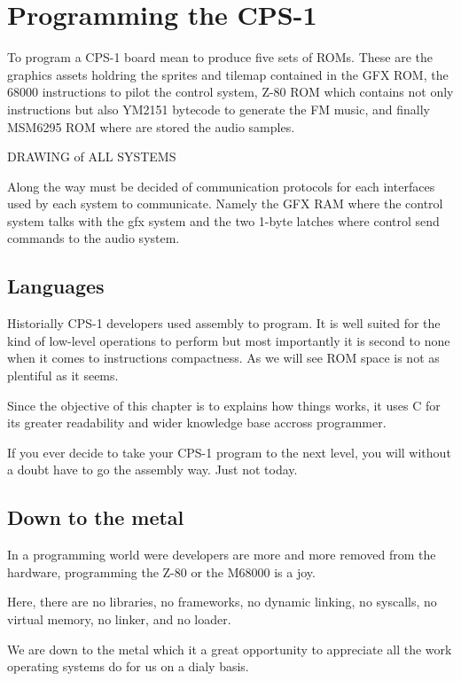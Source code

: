 \chapter{Programming the CPS-1}

To program a CPS-1 board mean to produce five sets of ROMs. These are the graphics assets holdring the sprites and tilemap contained in the GFX ROM, the 68000 instructions to pilot the control system, Z-80 ROM which contains not only instructions but also YM2151 bytecode to generate the FM music, and finally MSM6295 ROM where are stored the audio samples.

\vfill
DRAWING of ALL SYSTEMS

Along the way must be decided of communication protocols for each interfaces used by each system to communicate. Namely the GFX RAM where the control system talks with the gfx system and the two 1-byte latches where control send commands to the audio system.

\pagebreak

\section{Languages}
Historially CPS-1 developers used assembly to program. It is well suited for the kind of low-level operations to perform but most importantly it is second to none when it comes to instructions compactness. As we will see ROM space is not as plentiful as it seems.

Since the objective of this chapter is to explains how things works, it uses C for its greater readability and wider knowledge base accross programmer.

If you ever decide to take your CPS-1 program to the next level, you will without a doubt have to go the assembly way. Just not today.


\section{Down to the metal}
In a programming world were developers are more and more removed from the hardware, programming the Z-80 or the M68000 is a joy.

Here, there are no libraries, no frameworks, no dynamic linking, no syscalls, no virtual memory, no linker, and no loader.

We are down to the metal which it a great opportunity to appreciate all the work operating systems do for us on a dialy basis.

